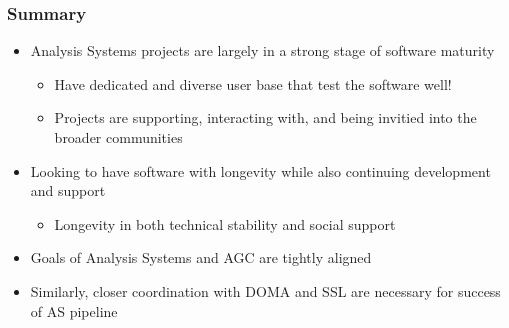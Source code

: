 \begin{frame}
  \frametitle{Summary}

  \begin{itemize}\setlength{\itemsep}{0.2 cm}
    \item Analysis Systems projects are largely in a strong stage of software maturity
    \begin{itemize}
      \item Have dedicated and diverse user base that test the software well!
      \item Projects are supporting, interacting with, and being invitied into the broader communities
    \end{itemize}
    \item Looking to have software with longevity while also continuing development and support
    \begin{itemize}
      \item Longevity in both technical stability and social support
    \end{itemize}
    \item Goals of Analysis Systems and AGC are tightly aligned
    \item Similarly, closer coordination with DOMA and SSL are necessary for success of AS pipeline
  \end{itemize}

\end{frame}
